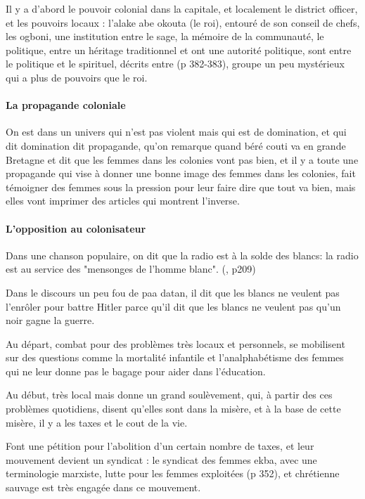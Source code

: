 \documentclass[a4paper, 11pt, hidelinks]{article}
\newcommand{\bs}{\bigskip}
\newcommand{\rb}[1]{\Romanbar{#1}}
\begin{document}
\bs 

Il y a d'abord le pouvoir colonial dans la capitale, et localement le district 
officer, et les pouvoirs locaux : l'alake abe okouta (le roi), entouré de son conseil de chefs, les 
ogboni, une institution entre le sage, la mémoire de la communauté, le politique, entre un héritage 
traditionnel et ont une autorité politique, sont entre le politique et le spirituel, décrits entre 
(p 382-383), groupe un peu mystérieux qui a plus de pouvoirs que le roi.



\paragraph{La propagande coloniale}


On est dans un univers qui n'est pas violent mais qui est de domination, et qui dit domination dit 
propagande, qu'on remarque quand béré couti va en grande Bretagne et dit que les femmes dans les colonies 
vont pas bien, et il y a toute une propagande qui vise à donner une bonne image des femmes dans les 
colonies, fait témoigner des femmes sous la pression pour leur faire dire que tout va bien, mais elles 
vont imprimer des articles qui montrent l'inverse.



\paragraph{L'opposition au colonisateur}

Dans une chanson populaire, on dit que la radio est à la solde des blancs: la radio est au service 
des "mensonges de l'homme blanc". (\rb{7}, p209) 


Dans le discours un peu fou de paa datan, il dit que les blancs ne veulent pas l'enrôler pour battre 
Hitler parce qu'il dit que les blancs ne veulent pas qu'un noir gagne la guerre.

\bs

Au départ, combat pour des problèmes très locaux et personnels, se mobilisent sur des questions comme 
la mortalité infantile et l'analphabétisme des femmes qui ne leur donne pas le bagage pour aider dans 
l'éducation. 
\bs

Au début, très local mais donne un grand soulèvement, qui, à partir des ces problèmes 
quotidiens, disent qu'elles sont dans la misère, et à la base de cette misère, il y a les taxes et le 
cout de la vie. 


Font une pétition pour l'abolition d'un certain nombre de taxes, et leur mouvement 
devient un syndicat : le syndicat des femmes ekba, avec une terminologie marxiste, lutte pour les 
femmes exploitées (p 352), et chrétienne sauvage est très engagée dans ce mouvement. 
\end{document}
